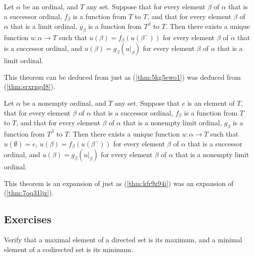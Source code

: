\documentclass{article}
\begin{document}
\begin{theorem}
  \label{thm:fi9epz7i}
  Let \(\alpha\) be an ordinal, and \(T\) any set.  Suppose that for
  every element \(\beta\) of \(\alpha\) that is a successor ordinal,
  \(f_\beta\) is a function from \(T\) to \(T\), and that for every
  element \(\beta\) of \(\alpha\) that is a limit ordinal, \(g_\beta\)
  is a function from \(T^\beta\) to \(T\).  Then there exists a unique
  function \(u : \alpha \to T\) such that
  \(u(\beta) = f_\beta(u(\beta^-))\) for every element \(\beta\) of
  \(\alpha\) that is a successor ordinal, and
  \(u(\beta) = g_\beta(u \vert_\beta)\) for every element \(\beta\) of
  \(\alpha\) that is a limit ordinal.
\end{theorem}

This theorem can be deduced from  just as
(\ref{thm:5kg5ewo1}) was deduced from (\ref{thm:srxrngd8}).

\begin{theorem}
  \label{thm:u18qlc0t}
  Let \(\alpha\) be a nonempty ordinal, and \(T\) any set.  Suppose
  that \(e\) is an element of \(T\), that for every element \(\beta\)
  of \(\alpha\) that is a successor ordinal, \(f_\beta\) is a function
  from \(T\) to \(T\), and that for every element \(\beta\) of
  \(\alpha\) that is a nonempty limit ordinal, \(g_\beta\) is a
  function from \(T^\beta\) to \(T\).  Then there exists a unique
  function \(u : \alpha \to T\) such that \(u(\emptyset) = e\),
  \(u(\beta) = f_\beta(u(\beta^-))\) for every element \(\beta\) of
  \(\alpha\) that is a successor ordinal, and
  \(u(\beta) = g_\beta(u \vert_\beta)\) for every element \(\beta\) of
  \(\alpha\) that is a nonempty limit ordinal.
\end{theorem}

This theorem is an expansion of  just as
(\ref{thm:kfr9z94i}) was an expansion of (\ref{thm:7oq31ljz}).

\subsection{Exercises}
\label{sec:q1c2w2jy}

\begin{exercise}
  \label{exe:swjbrepg}
  Verify that a maximal element of a directed set is its maximum, and
  a minimal element of a codirected set is its minimum.
\end{exercise}
\end{document}
